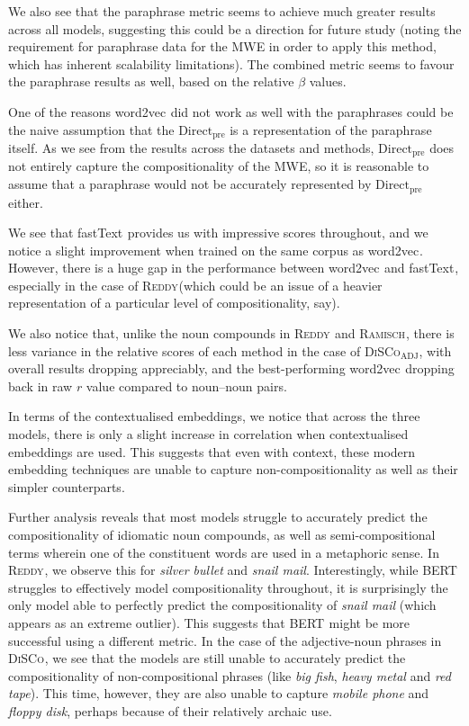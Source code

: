 \documentclass[11pt,a4paper]{article}
\newcommand{\embmethod}[2][]{\textsf{#2}$_{\text{#1}}$\xspace}
\newcommand{\wordtovec}{\embmethod{word2vec}}
\newcommand{\fasttext}{\embmethod{fastText}}
\newcommand{\bert}{\embmethod{BERT}}
\newcommand{\dataset}[2][]{\textsc{#2}$_{\text{#1}}$\xspace}
\newcommand{\reddy}{\dataset{Reddy}}
\newcommand{\ramisch}{\dataset{Ramisch}}
\newcommand{\discoj}[1][]{\dataset[#1]{DiSCo}}
\newcommand{\method}[2][]{\ensuremath{\text{#2}_{\text{#1}}}\xspace}
\newcommand{\presum}{\method[pre]{Direct}}
\begin{document}
We also see that the paraphrase metric seems to achieve much greater results across all models, suggesting this could be a direction for future study (noting the requirement for paraphrase data for the MWE in order to apply this method, which has inherent scalability limitations). The combined metric seems to favour the paraphrase results as well, based on the relative $\beta$ values.

One of the reasons \wordtovec did not work as well with the paraphrases could be the naive assumption that the \presum is a representation of the paraphrase itself. As we see from the results across the datasets and methods, \presum does not entirely capture the compositionality of the MWE, so it is reasonable to assume that a paraphrase would not be accurately represented by  \presum either. 

We see that \fasttext provides us with impressive scores throughout, and we notice a slight improvement when trained on the same corpus as \wordtovec. However, there is a huge gap in the performance between \wordtovec and \fasttext, especially in the case of \reddy (which could be an issue of a heavier representation of a particular level of compositionality, say).

We also notice that, unlike the noun compounds in \reddy and \ramisch, there is less variance in the relative scores of each method in the case of \discoj[ADJ], with overall results dropping appreciably, and the best-performing \wordtovec dropping back in raw $r$ value compared to noun--noun pairs.

In terms of the contextualised embeddings, we notice that across the three models, there is only a slight increase in correlation when contextualised embeddings are used. This suggests that even with context, these modern embedding techniques are unable to capture non-compositionality as well as their simpler counterparts.

Further analysis reveals that most models struggle to accurately predict the compositionality of idiomatic noun compounds, as well as semi-compositional terms wherein one of the constituent words are used in a metaphoric sense. In \reddy, we observe this for \textit{silver bullet} and \textit{snail mail}. Interestingly, while \bert struggles to effectively model compositionality throughout, it is surprisingly the only model able to perfectly predict the compositionality of \textit{snail mail} (which appears as an extreme outlier). This suggests that \bert might be more successful using a different metric. In the case of the adjective-noun phrases in \discoj, we see that the models are still unable to accurately predict the compositionality of non-compositional phrases (like \textit{big fish}, \textit{heavy metal} and \textit{red tape}). This time, however, they are also unable to capture \textit{mobile phone} and \textit{floppy disk}, perhaps because of their relatively archaic use.
\end{document}
